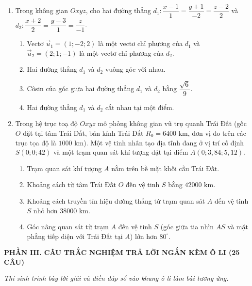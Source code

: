 \documentclass[12pt,a4paper]{article}
\begin{document}
\begin{enumerate}
\needspace{6.5cm}
\item Trong không gian $Oxyz$, cho hai đường thẳng $d_1: \dfrac{x-1}{1} = \dfrac{y+1}{-2} = \dfrac{z-2}{2}$ và $d_2: \dfrac{x+2}{2} = \dfrac{y-3}{1} = \dfrac{z}{-1}$.
\begin{enumerate}[label=\alph*),leftmargin=*,itemsep=3pt]
    \item Vectơ $\vec{u}_1 = (1; -2; 2)$ là một vectơ chỉ phương của $d_1$ và $\vec{u}_2 = (2; 1; -1)$ là một vectơ chỉ phương của $d_2$.
    \item Hai đường thẳng $d_1$ và $d_2$ vuông góc với nhau.
    \item Côsin của góc giữa hai đường thẳng $d_1$ và $d_2$ bằng $\dfrac{\sqrt{6}}{9}$.
    \item Hai đường thẳng $d_1$ và $d_2$ cắt nhau tại một điểm.
\end{enumerate}

\needspace{6.5cm}
\item Trong hệ trục toạ độ $Oxyz$ mô phỏng không gian vũ trụ quanh Trái Đất (gốc $O$ đặt tại tâm Trái Đất, bán kính Trái Đất $R_0 = 6400\text{ km}$, đơn vị đo trên các trục tọa độ là $1000\text{ km}$). Một vệ tinh nhân tạo địa tĩnh đang ở vị trí cố định $S(0; 0; 42)$ và một trạm quan sát khí tượng đặt tại điểm $A(0; 3{,}84; 5{,}12)$.
\begin{enumerate}[label=\alph*),leftmargin=*,itemsep=3pt]
    \item Trạm quan sát khí tượng $A$ nằm trên bề mặt khối cầu Trái Đất.
    \item Khoảng cách từ tâm Trái Đất $O$ đến vệ tinh $S$ bằng $42000\text{ km}$.
    \item Khoảng cách truyền tín hiệu đường thẳng từ trạm quan sát $A$ đến vệ tinh $S$ nhỏ hơn $38000\text{ km}$.
    \item Góc nâng quan sát từ trạm $A$ đến vệ tinh $S$ (góc giữa tia nhìn $AS$ và mặt phẳng tiếp diện với Trái Đất tại $A$) lớn hơn $80^\circ$.
\end{enumerate}
\end{enumerate}

\newpage
\begin{center}
    {\fontsize{13}{15}\selectfont\textbf{PHẦN III. CÂU TRẮC NGHIỆM TRẢ LỜI NGẮN KÈM Ô LI (25 CÂU)}}
\end{center}
\textit{Thí sinh trình bày lời giải và điền đáp số vào khung ô li làm bài tương ứng.}
\end{document}
